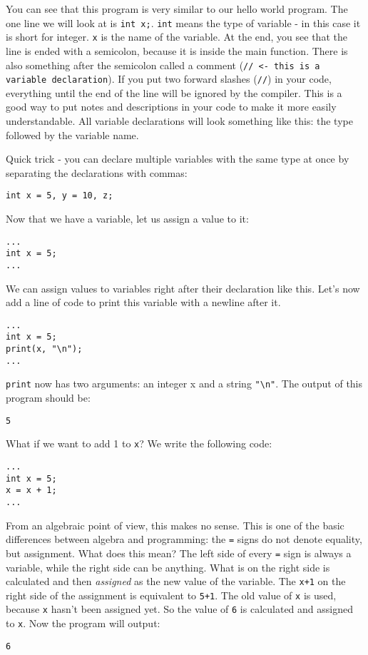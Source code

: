 \documentclass[10pt,a4paper]{article}
\begin{document}
You can see that this program is very similar to our hello world program. The one line we will look at is \verb|int x;|. \verb|int| means the type of variable - in this case it is short for integer. \verb|x| is the name of the variable. At the end, you see that the line is ended with a semicolon, because it is inside the main function. There is also something after the semicolon called a comment (\verb|// <- this is a variable declaration|). If you put two forward slashes (\verb|//|) in your code, everything until the end of the line will be ignored by the compiler. This is a good way to put notes and descriptions in your code to make it more easily understandable. All variable declarations will look something like this: the type followed by the variable name.

Quick trick - you can declare multiple variables with the same type at once by separating the declarations with commas:
\begin{verbatim}
int x = 5, y = 10, z;
\end{verbatim}

Now that we have a variable, let us assign a value to it:
\begin{verbatim}
...
int x = 5;
...
\end{verbatim}

We can assign values to variables right after their declaration like this. Let's now add a line of code to print this variable with a newline after it.
\begin{verbatim}
...
int x = 5;
print(x, "\n");
...
\end{verbatim}

\verb|print| now has two arguments: an integer x and a string \verb|"\n"|. The output of this program should be:
\begin{verbatim}
5
\end{verbatim}

What if we want to add 1 to \verb|x|? We write the following code:
\begin{verbatim}
...
int x = 5;
x = x + 1;
...
\end{verbatim}

From an algebraic point of view, this makes no sense. This is one of the basic differences between algebra and programming: the \verb|=| signs do not denote equality, but assignment. What does this mean? The left side of every \verb|=| sign is always a variable, while the right side can be anything. What is on the right side is calculated and then \textit{assigned} as the new value of the variable. The \verb|x+1| on the right side of the assignment is equivalent to \verb|5+1|. The old value of \verb|x| is used, because \verb|x| hasn't been assigned yet. So the value of \verb|6| is calculated and assigned to \verb|x|. Now the program will output:
\begin{verbatim}
6
\end{verbatim}
\end{document}
